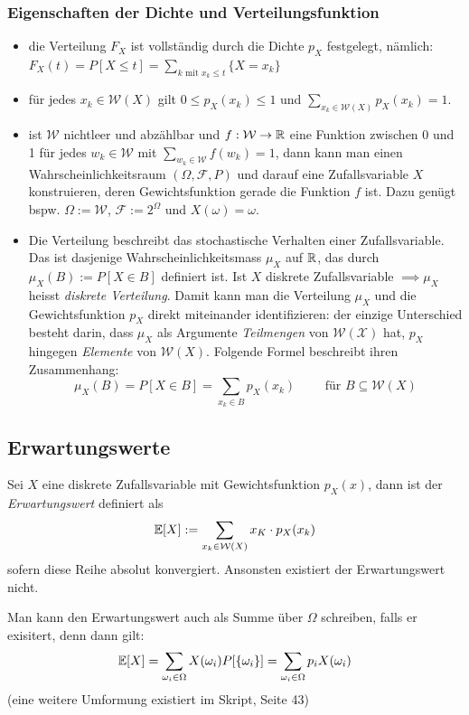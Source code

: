 \subsubsection*{Eigenschaften der Dichte und Verteilungsfunktion}
\begin{itemize}
\item die Verteilung $F_X$ ist vollständig durch die Dichte $p_X$ festgelegt, nämlich: $F_X(t) = P[X \leq t] = \sum_{k \mbox{ mit } x_k \leq t} \{X = x_k\}$
\item für jedes $x_k \in \mathcal{W}(X)$ gilt $0 \leq p_X(x_k) \leq 1$ und $\sum_{x_k \in \mathcal{W}(X)} p_X(x_k) = 1$.
\item ist $\mathcal{W}$ nichtleer und abzählbar und $f:\mathcal{W}\to \mathbb{R}$ eine Funktion zwischen 0 und 1 für jedes $w_k \in \mathcal{W}$ mit $\sum_{w_k \in \mathcal{W}} f(w_k) = 1$, dann kann man einen Wahrscheinlichkeitsraum $(\Omega, \mathcal{F}, P)$ und darauf eine Zufallsvariable $X$ konstruieren, deren Gewichtsfunktion gerade die Funktion $f$ ist. Dazu genügt bspw. $\Omega := \mathcal{W}$, $\mathcal{F} := 2^\Omega$ und $X(\omega) = \omega$.
\item Die Verteilung beschreibt das stochastische Verhalten einer Zufallsvariable. Das ist dasjenige Wahrscheinlichkeitsmass $\mu_X$ auf $\mathbb{R}$, das durch $\mu_X(B) := P[X \in B]$ definiert ist. Ist $X$ diskrete Zufallsvariable $\implies \mu_X$ heisst \textit{diskrete Verteilung}. Damit kann man die Verteilung $\mu_X$ und die Gewichtsfunktion $p_X$ direkt miteinander identifizieren: der einzige Unterschied besteht darin, dass $\mu_X$ als Argumente \textit{Teilmengen} von $\mathcal{W(X)}$ hat, $p_X$ hingegen \textit{Elemente} von $\mathcal{W}(X)$. Folgende Formel beschreibt ihren Zusammenhang:
$$ \mu_X(B) = P[X \in B] = \sum_{x_k \in B} p_X(x_k) \quad \quad \mbox{ für } B\subseteq \mathcal{W}(X)$$
\end{itemize}


\subsection{Erwartungswerte}
\begin{definition}
Sei $X$ eine diskrete Zufallsvariable mit Gewichtsfunktion $p_X(x)$, dann ist der \textit{Erwartungswert} definiert als
$$ \mathbb{E}[X] := \sum_{x_k \in \mathcal{W}(X)} x_K \cdot p_X(x_k)$$
sofern diese Reihe absolut konvergiert. Ansonsten existiert der Erwartungswert nicht.
\end{definition}
Man kann den Erwartungswert auch als Summe über $\Omega$ schreiben, falls er exisitert, denn dann gilt:
$$ \mathbb{E}[X] = \sum_{\omega_i \in \Omega} X(\omega_i) P[\{\omega_i\}] = \sum_{\omega_i \in \Omega} p_i X(\omega_i)$$
(eine weitere Umformung existiert im Skript, Seite 43)

